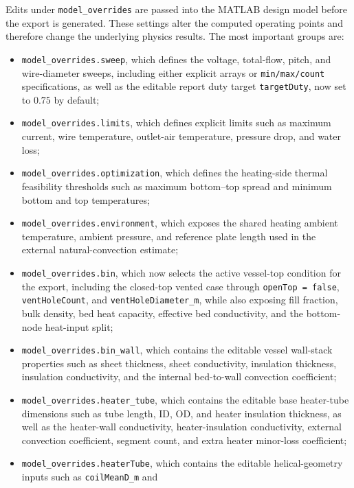 \documentclass{article}
\begin{document}
Edits under \texttt{model\_overrides} are passed into the MATLAB design model
before the export is generated. These settings alter the computed operating
points and therefore change the underlying physics results. The most important
groups are:
\begin{itemize}
\item \texttt{model\_overrides.sweep}, which defines the voltage, total-flow,
      pitch, and wire-diameter sweeps, including either explicit arrays or
      \texttt{min/max/count} specifications, as well as the editable report
      duty target \texttt{targetDuty}, now set to $0.75$ by default;
\item \texttt{model\_overrides.limits}, which defines explicit limits such as
      maximum current, wire temperature, outlet-air temperature, pressure
      drop, and water loss;
\item \texttt{model\_overrides.optimization}, which defines the heating-side
      thermal feasibility thresholds such as maximum bottom--top spread and
      minimum bottom and top temperatures;
\item \texttt{model\_overrides.environment}, which exposes the shared heating
      ambient temperature, ambient pressure, and reference plate length used
      in the external natural-convection estimate;
\item \texttt{model\_overrides.bin}, which now selects the active vessel-top
      condition for the export, including the closed-top vented case through
      \texttt{openTop = false}, \texttt{ventHoleCount}, and
      \texttt{ventHoleDiameter\_m}, while also exposing fill fraction, bulk
      density, bed heat capacity, effective bed conductivity, and the
      bottom-node heat-input split;
\item \texttt{model\_overrides.bin\_wall}, which contains the editable vessel
      wall-stack properties such as sheet thickness, sheet conductivity,
      insulation thickness, insulation conductivity, and the internal
      bed-to-wall convection coefficient;
\item \texttt{model\_overrides.heater\_tube}, which contains the editable
      base heater-tube dimensions such as tube length, ID, OD, and heater
      insulation thickness, as well as the heater-wall conductivity,
      heater-insulation conductivity, external convection coefficient,
      segment count, and extra heater minor-loss coefficient;
\item \texttt{model\_overrides.heaterTube}, which contains the editable
      helical-geometry inputs such as \texttt{coilMeanD\_m} and

\end{itemize}
\end{document}
